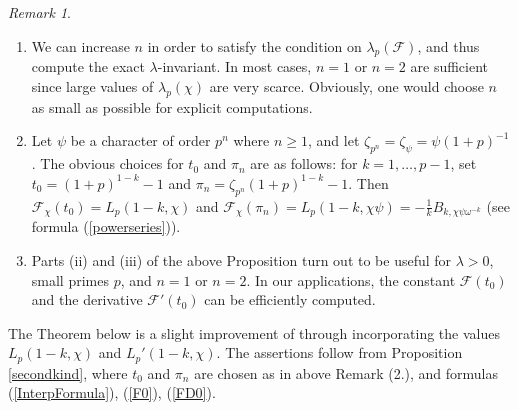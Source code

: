\documentclass[pdflatex,sn-mathphys-num]{sn-jnl}%
\theoremstyle{plain}
\theoremstyle{definition}
\theoremstyle{remark}
\newtheorem*{rem*}{Remark}
\numberwithin{equation}{section}
\begin{document}
\begin{rem*} \begin{enumerate}
\item We can increase $n$ in order to satisfy the condition on $\lambda_p(\mathcal{F})$, and thus compute the exact $\lambda$-invariant. In most cases, $n=1$ or $n=2$ are sufficient since large values of $\lambda_p(\chi)$ are very scarce. Obviously, one would choose $n$ as small as possible for explicit computations.

\item Let $\psi$ be a character of order $p^n$ where $n\geq 1$, and let $\zeta_{p^n}=\zeta_{\psi}=\psi(1+p)^{-1}$.
The obvious choices for $t_0$ and $\pi_n$ are as follows: for $k=1,\dots,p-1$, set $t_0=(1+p)^{1-k}-1$ and $\pi_n = \zeta_{p^n}(1+p)^{1-k}-1$. Then 
 $\mathcal{F}_{\chi}(t_0) = L_p(1-k,\chi)$ and  
 $\mathcal{F}_{\chi}(\pi_n) =  
L_p(1-k,\chi\psi)=- \frac{1}{k} B_{k,\chi\psi\omega^{-k}}$ (see formula (\ref{powerseries})).
 

\item Parts (ii) and (iii) of the above Proposition turn out to be useful for $\lambda >0$, small primes $p$, and $n=1$ or $n=2$. In our applications, the constant $\mathcal{F}(t_0)$ and the derivative  $\mathcal{F}'(t_0)$ can be efficiently computed.
\end{enumerate}
\end{rem*}

The Theorem below is a slight improvement of \cite{ErMe} through incorporating the values $L_p(1-k,\chi)$ and $L_p'(1-k,\chi)$. The assertions follow from Proposition \ref{secondkind}, where $t_0$ and $\pi_n$ are chosen as in above Remark (2.), and formulas (\ref{InterpFormula}), (\ref{F0}), (\ref{FD0}).
\end{document}
